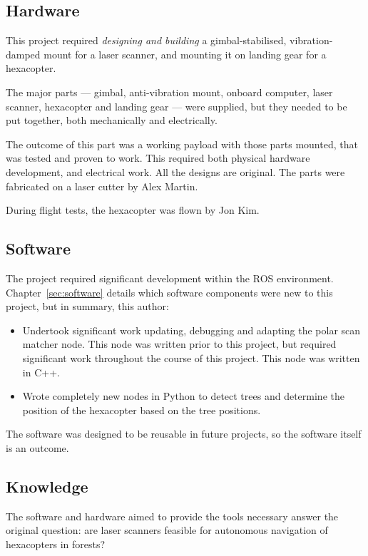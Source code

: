 \documentclass[12pt,oneside,a4paper]{book}
\begin{document}
\subsection{Hardware}
\label{sec:hardware-1}

This project required \emph{designing and building} a
gimbal-stabilised, vibration-damped mount for a laser scanner, and
mounting it on landing gear for a hexacopter.

The major parts --- gimbal, anti-vibration mount, onboard computer, laser
scanner, hexacopter and landing gear --- were supplied, but they needed
to be put together, both mechanically and electrically.

The outcome of this part was a working payload with those parts
mounted, that was tested and proven to work. This required both
physical hardware development, and electrical work. All the designs
are original. The parts were fabricated on a laser cutter by Alex
Martin.

During flight tests, the hexacopter was flown by Jon Kim.

\subsection{Software}
\label{sec:software-1}

The project required significant development within the \gls{ROS}
environment. Chapter~\ref{sec:software} details which software
components were new to this project, but in summary, this author:
\begin{itemize}
\item Undertook significant work updating, debugging and adapting the
  polar scan matcher node. This node was written prior to this
  project, but required significant work throughout the course of this
  project. This node was written in C++.
\item Wrote completely new nodes in Python to detect trees and
  determine the position of the hexacopter based on the tree
  positions.
\end{itemize}

The software was designed to be reusable in future projects, so the
software itself is an outcome.

\subsection{Knowledge}
\label{sec:knowledge}

The software and hardware aimed to provide the tools
necessary answer the original question: are laser scanners feasible
for autonomous navigation of hexacopters in forests?
\end{document}
